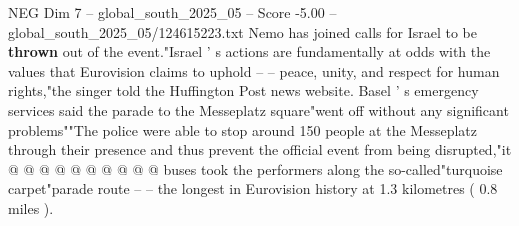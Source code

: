 \begin{textsample}{NEG Dim 7 – global\_south\_2025\_05 – Score -5.00 – global\_south\_2025\_05/124615223.txt}
Nemo has joined calls for Israel to be \textbf{thrown} out of the event."Israel ' s actions are fundamentally at odds with the values that Eurovision claims to uphold -- -- peace, unity, and respect for human rights,"the singer told the Huffington Post news website.
Basel ' s emergency services said the parade to the Messeplatz square"went off without any significant problems""The police were able to stop around 150 people at the Messeplatz through their presence and thus prevent the official event from being disrupted,"it @ @ @ @ @ @ @ @ @ @ buses took the performers along the so-called"turquoise carpet"parade route -- -- the longest in Eurovision history at 1.3 kilometres ( 0.8 miles ).

\end{textsample}
